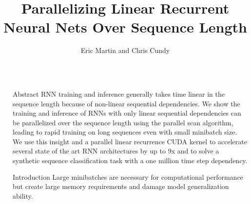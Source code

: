 \documentclass[final]{beamer}
\title{Parallelizing Linear Recurrent Neural Nets Over Sequence Length} %
\author{Eric Martin and Chris Cundy} %
\institute{FILL IN INSTITUTES} %
\newlength{\sepwid}
\newlength{\onecolwid}
\begin{document}

\setlength{\belowcaptionskip}{2ex} %
\setlength\belowdisplayshortskip{2ex} %

\begin{frame}[t] %

\begin{columns}[t] %

\begin{column}{\sepwid}\end{column} %

\begin{column}{\onecolwid} %


\begin{alertblock}{Abstract}
RNN training and inference generally takes time linear in the sequence length because
of non-linear sequential dependencies.
We show the training and inference of RNNs with only linear
sequential dependencies can be parallelized over the sequence length using the
parallel scan algorithm, leading to rapid training on long sequences even with
small minibatch size. We use this insight and a parallel linear recurrence CUDA
kernel to accelerate several state of the art RNN architectures by up to 9x and
to solve a synthetic sequence classification task with a one million time step
dependency.
\end{alertblock}

\begin{block}{Introduction}
Large minibatches are necessary for computational performance but create large memory
requirements and damage model generalization ability.


\end{block}
\end{column}
\end{columns}
\end{frame}
\end{document}
